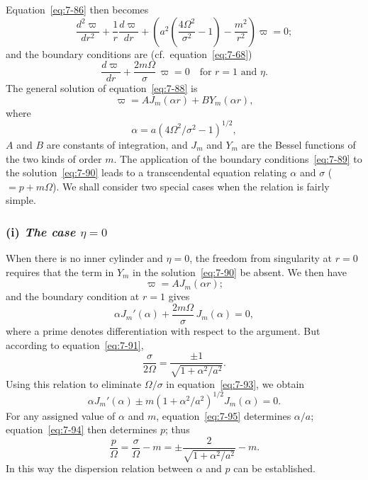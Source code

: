 Equation~\eqref{eq:7-86} then becomes
\begin{equation}
\label{eq:7-88}
\frac{d^2\varpi}{dr^2}+\frac{1}{r}\frac{d\varpi}{dr}
+ \left(a^2\!\left(\frac{4\Omega^2}{\sigma^2}-1\right)
- \frac{m^2}{r^2}\right)\varpi = 0;
\end{equation}
and the boundary conditions are (cf.\ equation~\eqref{eq:7-68})
\begin{equation}
\label{eq:7-89}
\frac{d\varpi}{dr}+\frac{2m\Omega}{\sigma}\,\varpi = 0
\quad \text{for } r = 1 \text{ and } \eta.
\end{equation}
The general solution of equation~\eqref{eq:7-88} is
\begin{equation}
\label{eq:7-90}
\varpi = A J_m(\alpha r) + B Y_m(\alpha r),
\end{equation}
where
\begin{equation}
\label{eq:7-91}
\alpha = a(4\Omega^2/\sigma^2-1)^{1/2},
\end{equation}
$A$ and $B$ are constants of integration, and $J_m$ and $Y_m$ are the Bessel functions of the two kinds of order $m$.  The application of the boundary
conditions~\eqref{eq:7-89} to the solution~\eqref{eq:7-90} leads to a transcendental equation
relating $\alpha$ and $\sigma$ ($= p+m\Omega$).  We shall consider two special cases when
the relation is fairly simple.

\subsubsection*{(i) \emph{The case $\eta = 0$}}
When there is no inner cylinder and $\eta = 0$, the freedom from
singularity at $r = 0$ requires that the term in $Y_m$ in the solution~\eqref{eq:7-90} be
absent.  We then have
\begin{equation}
\label{eq:7-92}
\varpi = A J_m(\alpha r);
\end{equation}
and the boundary condition at $r = 1$ gives
\begin{equation}
\label{eq:7-93}
\alpha J_m'(\alpha) + \frac{2m\Omega}{\sigma}\, J_m(\alpha) = 0,
\end{equation}
where a prime denotes differentiation with respect to the argument.
But according to equation~\eqref{eq:7-91},
\begin{equation}
\label{eq:7-94}
\frac{\sigma}{2\Omega} = \frac{\pm 1}{\sqrt{1+\alpha^2/a^2}}.
\end{equation}
Using this relation to eliminate $\Omega/\sigma$ in equation~\eqref{eq:7-93}, we obtain
\begin{equation}
\label{eq:7-95}
\alpha J_m'(\alpha) \pm m(1+\alpha^2/a^2)^{1/2} J_m(\alpha) = 0.
\end{equation}
For any assigned value of $\alpha$ and $m$, equation~\eqref{eq:7-95} determines $\alpha/a$; equation~\eqref{eq:7-94} then determines $p$; thus
\begin{equation}
\label{eq:7-96}
\frac{p}{\Omega} = \frac{\sigma}{\Omega} - m = \pm\frac{2}{\sqrt{1+\alpha^2/a^2}} - m.
\end{equation}
In this way the dispersion relation between $\alpha$ and $p$ can be established.

